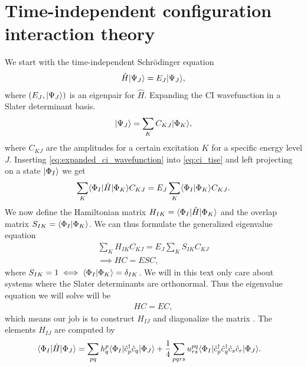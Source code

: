      \section{Time-independent configuration interaction theory}
        We start with the time-independent Schrödinger equation
        \begin{align}
            \hat{H}| \Psi_J \rangle = E_J| \Psi_J \rangle,
            \label{eq:ci_tise}
        \end{align}
        where $(E_J, | \Psi_J \rangle)$ is an eigenpair for $\hat{H}$.
        Expanding the CI wavefunction in a Slater determinant basis.
        \begin{align}
            | \Psi_J \rangle = \sum_{K} C_{KJ}| \Phi_K \rangle,
            \label{eq:expanded_ci_wavefunction}
        \end{align}
        where $C_{KJ}$ are the amplitudes for a certain excitation $K$ for a
        specific energy level $J$.
        Inserting \autoref{eq:expanded_ci_wavefunction} into
        \autoref{eq:ci_tise} and left projecting on a state $| \Phi_I \rangle$ we
        get
        \begin{align}
            \sum_{K}\langle \Phi_I |\hat{H}| \Phi_K \rangle C_{KJ}
            = E_J\sum_{K}\langle \Phi_I | \Phi_K \rangle C_{KJ}.
        \end{align}
        We now define the Hamiltonian matrix $H_{IK} =
        \langle \Phi_I |\hat{H}| \Phi_K \rangle$ and the overlap matrix $S_{IK} =
        \langle \Phi_I | \Phi_K \rangle$.
        We can thus formulate the generalized eigenvalue equation
        \begin{gather}
            \sum_{K}H_{IK}C_{KJ} = E_J\sum_{K}S_{IK}C_{KJ}
            \\
            \implies
            HC = ESC,
        \end{gather}
        where $S_{IK} = 1 \iff \langle \Phi_I | \Phi_K \rangle = \delta_{IK}$.
        We will in this text only care about systems where the Slater
        determinants are orthonormal.
        Thus the eigenvalue equation we will solve will be
        \begin{align}
            HC = EC,
        \end{align}
        which means our job is to construct $H_{IJ}$ and diagonalize the
        matrix \cite{karwowski}.
        The elements $H_{IJ}$ are computed by
        \begin{align}
            \langle \Phi_I |\hat{H}| \Phi_J \rangle
            &= \sum_{pq}h^{p}_{q}
            \langle \Phi_I |\hat{c}_{p}^{\dagger}\hat{c}_{q}| \Phi_J \rangle
            + \frac{1}{4}\sum_{pqrs}u^{pq}_{rs}
            \langle \Phi_I |\hat{c}_{p}^{\dagger}\hat{c}_{q}^{\dagger}\hat{c}_{s}\hat{c}_{r}| \Phi_J \rangle.
        \end{align}
